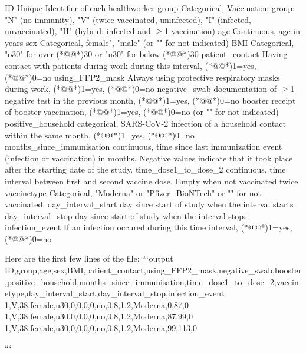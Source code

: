 \documentclass[11pt]{article}
\begin{document}
\begin{codeoutput}
ID	Unique Identifier of each healthworker
group	Categorical, Vaccination group: "N" (no immunity), "V" (twice vaccinated, uninfected), "I" (infected, unvaccinated), "H" (hybrid: infected and $\geq$1 vaccination)
age	Continuous, age in years 
sex	Categorical, female", "male" (or "" for not indicated)	
BMI	Categorical, "o30" for over (*@@*)30  or "u30" for below (*@@*)30	
patient\_contact	Having contact with patients during work during this interval, (*@@*)1=yes, (*@@*)0=no 
using\_FFP2\_mask	Always using protective respiratory masks during work, (*@@*)1=yes, (*@@*)0=no 
negative\_swab	documentation of $\geq$1 negative test in the previous month, (*@@*)1=yes, (*@@*)0=no 
booster	receipt of booster vaccination, (*@@*)1=yes, (*@@*)0=no (or "" for not indicated)	
positive\_household	categorical, SARS-CoV-2 infection of a household contact within the same month, (*@@*)1=yes, (*@@*)0=no	
months\_since\_immunisation	continuous, time since last immunization event (infection or vaccination) in months. Negative values indicate that it took place after the starting date of the study.
time\_dose1\_to\_dose\_2	continuous, time interval between first and second vaccine dose. Empty when not vaccinated twice
vaccinetype	Categorical, "Moderna" or "Pfizer\_BioNTech" or "" for not vaccinated.	
day\_interval\_start	day since start of study when the interval starts
day\_interval\_stop	day since start of study when the interval stops	
infection\_event	If an infection occured during this time interval, (*@@*)1=yes, (*@@*)0=no

Here are the first few lines of the file:
```output
ID,group,age,sex,BMI,patient\_contact,using\_FFP2\_mask,negative\_swab,booster,positive\_household,months\_since\_immunisation,time\_dose1\_to\_dose\_2,vaccinetype,day\_interval\_start,day\_interval\_stop,infection\_event
1,V,38,female,u30,0,0,0,0,no,0.8,1.2,Moderna,0,87,0
1,V,38,female,u30,0,0,0,0,no,0.8,1.2,Moderna,87,99,0
1,V,38,female,u30,0,0,0,0,no,0.8,1.2,Moderna,99,113,0

```


\end{codeoutput}
\end{document}
